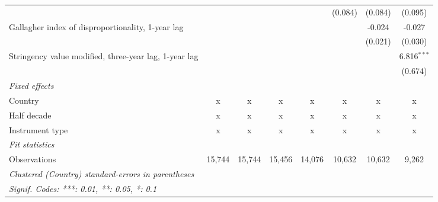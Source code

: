 \begin{table}[htbp]
\begin{tabular}{lccccccc}
                                                            &              &              &             &              & (0.084)       & (0.084)       & (0.095)\\   
      Gallagher index of disproportionality, 1-year lag     &              &              &             &              &               & -0.024        & -0.027\\   
                                                            &              &              &             &              &               & (0.021)       & (0.030)\\   
      Stringency value modified, three-year lag, 1-year lag &              &              &             &              &               &               & 6.816$^{***}$\\   
                                                            &              &              &             &              &               &               & (0.674)\\   
      \emph{Fixed effects}\\
      Country                                               & x            & x            & x           & x            & x             & x             & x\\  
      Half decade                                           & x            & x            & x           & x            & x             & x             & x\\  
      Instrument type                                       & x            & x            & x           & x            & x             & x             & x\\  
      \midrule \emph{Fit statistics}\\
      Observations                                          & 15,744       & 15,744       & 15,456      & 14,076       & 10,632        & 10,632        & 9,262\\  
      \midrule
      \multicolumn{8}{l}{\emph{Clustered (Country) standard-errors in parentheses}}\\
      \multicolumn{8}{l}{\emph{Signif. Codes: ***: 0.01, **: 0.05, *: 0.1}}\\
   \end{tabular}
\end{table}


